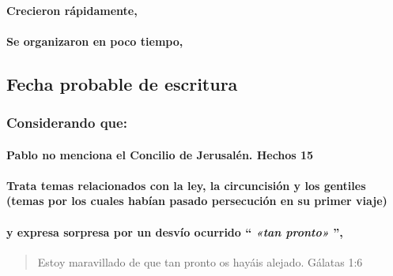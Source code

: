 \documentclass[11a pt,twoside]{article}
\newcommand{\scripture}[1]{%
  {\fontsize{12pt}{16pt}\selectfont\ScriptureFont\itshape #1}%
}
\def\textbf#1{#1}%
\let\oldsubsection\subsection
\renewcommand{\subsection}{\needspace{5\baselineskip}\oldsubsection}
\let\oldsubsubsection\subsubsection
\renewcommand{\subsubsection}{\needspace{4\baselineskip}\oldsubsubsection}
\let\oldparagraph\paragraph
\renewcommand{\paragraph}{\needspace{3\baselineskip}\oldparagraph}
\begin{document}
\paragraph{Crecieron rápidamente,}\label{crecieron-ruxe1pidamente}

\paragraph{Se organizaron en poco
tiempo,}\label{se-organizaron-en-poco-tiempo}

\subsection{Fecha probable de
escritura}\label{fecha-probable-de-escritura}

\subsubsection{Considerando que:}\label{considerando-que}

\paragraph{\texorpdfstring{Pablo no menciona el \textbf{Concilio de
Jerusalén}. Hechos
15}{Pablo no menciona el Concilio de Jerusalén. Hechos 15}}\label{pablo-no-menciona-el-concilio-de-jerusaluxe9n.-hechos-15}

\paragraph{Trata temas relacionados con la ley, la circuncisión y los
gentiles (temas por los cuales habían pasado persecución en su primer
viaje)}\label{trata-temas-relacionados-con-la-ley-la-circuncisiuxf3n-y-los-gentiles-temas-por-los-cuales-habuxedan-pasado-persecuciuxf3n-en-su-primer-viaje}

\paragraph{\texorpdfstring{y expresa sorpresa por un desvío ocurrido
``\scripture{«tan pronto»}'',}{y expresa sorpresa por un desvío ocurrido ``\,'',}}\label{y-expresa-sorpresa-por-un-desvuxedo-ocurrido-tan-pronto}

\begin{quote}
Estoy maravillado de que tan pronto os hayáis alejado. Gálatas 1:6
\end{quote}
\end{document}
